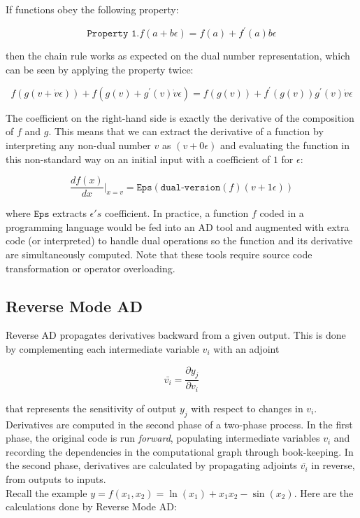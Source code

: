\documentclass[11pt]{article}
\theoremstyle{definition}
\theoremstyle{plain}
\begin{document}
\noindent If functions obey the following property:

$$ \texttt{Property 1.} f(a + b \epsilon) = f(a) + f^\prime(a) b \epsilon$$

\noindent then the chain rule works as expected on the dual number representation, which
can be seen by applying the property twice:

$$ f(g(v + \dot{v}\epsilon)) + f(g(v) + g^\prime(v) \dot{v} \epsilon) =
f(g(v)) + f^\prime(g(v))g^\prime(v) \dot{v} \epsilon $$

\noindent The coefficient on the right-hand side is exactly the derivative of the
composition of $f$ and $g$. 
This means that we can extract the derivative of a function by interpreting
any non-dual number $v$ as $(v + 0 \epsilon)$ and evaluating the function
in this non-standard way on an initial input with a coefficient of $1$ for $\epsilon$:

$$ \frac{d f(x)}{dx} \rvert_{x=v} = \texttt{Eps}(\texttt{dual-version}(f)(v+1\epsilon)) $$

\noindent where $\texttt{Eps}$ extracts $\epsilon's$ coefficient.
In practice, a function $f$ coded in a programming language would be fed
into an AD tool and augmented with extra code (or interpreted) to handle
dual operations so the function and its derivative are simultaneously computed.
Note that these tools require source code transformation or operator overloading.

\subsection{Reverse Mode AD}

\noindent Reverse AD propagates derivatives backward from a given output. This
is done by complementing each intermediate variable $v_i$ with an adjoint

$$ \bar{v_i} = \frac{\partial y_j}{\partial v_i} $$

\noindent that represents the sensitivity of output $y_j$ with respect
to changes in $v_i$. Derivatives are computed in the second phase of a two-phase process.
In the first phase, the original code is run \textit{forward}, populating intermediate
variables $v_i$ and recording the dependencies in the computational graph through
book-keeping. In the second phase, derivatives are calculated by propagating adjoints
$\bar{v_i}$ in reverse, from outputs to inputs.\\

\noindent Recall the example $y = f(x_1,x_2) = \ln(x_1) + x_1 x_2 - \sin(x_2)$.
Here are the calculations done by Reverse Mode AD:
\end{document}
